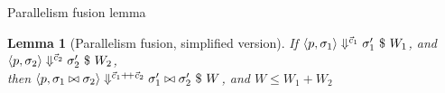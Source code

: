 \documentclass{beamer}
\newtheorem{lem}[thm]{Lemma}
\newtheorem{defi}[thm]{Definition}
\begin{document}
\begin{frame}[fragile,shrink=20]{Parallelism fusion lemma}
\begin{lem}[Parallelism fusion, simplified version]
If $\left\langle p,\sigma_1 \right\rangle \Downarrow^{\vec c_1} \sigma_1' \ \$ \ W_1$, and $\left\langle p,\sigma_2 \right\rangle \Downarrow^{\vec c_2} \sigma_2' \ \$ \ W_2$, \\
then $\seval{p}{\sgm_1 \x{} \sgm_2}{\c_1 {\++} \c_2}{ \sgm_1' \x{} \sgm_2' }{W}$, and $W \le W_1 + W_2$
\end{lem}




%
%
%

\end{frame}
\end{document}
